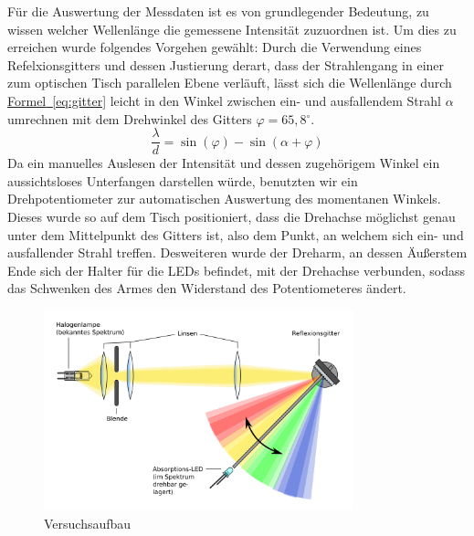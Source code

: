 \documentclass[11pt]{scrartcl}
\newcommand{\degr}{\ensuremath{^\circ}}
\newcommand{\hypref}[2]{\hyperref[#2]{{#1}~\ref{#2}}}
\begin{document}
F\"ur die Auswertung der Messdaten ist es von grundlegender Bedeutung, zu wissen welcher Wellenl\"ange die gemessene Intensit\"at zuzuordnen ist. Um dies zu erreichen wurde folgendes Vorgehen gew\"ahlt: Durch die Verwendung eines Refelxionsgitters und dessen Justierung derart, dass der Strahlengang in einer zum optischen Tisch parallelen Ebene verl\"auft, l\"asst sich die Wellenl\"ange durch \hypref{Formel}{eq:gitter} leicht in den Winkel zwischen ein- und ausfallendem Strahl $\alpha$ umrechnen mit dem Drehwinkel des Gitters $\varphi = 65,8\degr$.
\begin{equation}
\frac{\lambda}{d} = \sin(\varphi) - \sin(\alpha + \varphi)
\label{eq:gitter}
\end{equation}
Da ein manuelles Auslesen der Intensit\"at und dessen zugeh\"origem Winkel ein aussichtsloses Unterfangen darstellen w\"urde, benutzten wir ein Drehpotentiometer zur automatischen Auswertung des momentanen Winkels. Dieses wurde so auf dem Tisch positioniert, dass die Drehachse m\"oglichst genau unter dem Mittelpunkt des Gitters ist, also dem Punkt, an welchem sich ein- und ausfallender Strahl treffen. Desweiteren wurde der Dreharm, an dessen \"Au\ss{}erstem Ende sich der Halter f\"ur die LEDs befindet, mit der Drehachse verbunden, sodass das Schwenken des Armes den Widerstand des Potentiometeres \"andert.
\begin{figure}[ht]
\begin{center}
\includegraphics[width=0.8\textwidth]{images/setup.jpg}
\end{center}
\vspace{-1.5\baselineskip}
\caption{Versuchsaufbau}
\label{Versuchsaufbau}
\end{figure}
\end{document}
